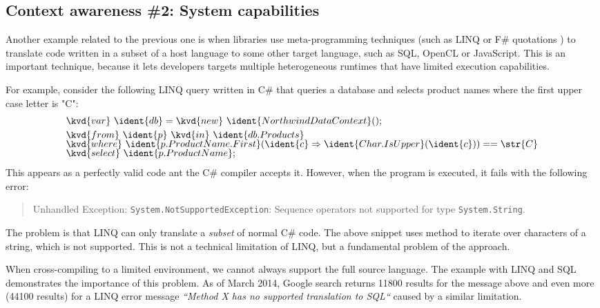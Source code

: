 
\subsection{Context awareness \#2: System capabilities}

Another example related to the previous one is when libraries use meta-programming techniques
(such as LINQ \cite{app-linq} or F\# quotations \cite{app-fsharp-metaprog}) to translate code
written in a subset of a host language to some other target language, such as SQL, OpenCL or 
JavaScript. This is an important technique, because it lets developers targets multiple 
heterogeneous runtimes that have limited execution capabilities.

For example, consider the following LINQ query written in C\# that queries a database and
selects product names where the first upper case letter is "C":
%
\begin{equation*}
\begin{array}{l}
\kvd{var}~\ident{db} = \kvd{new}~\ident{NorthwindDataContext}();\\[0.25em]
\kvd{from}~\ident{p}~\kvd{in}~\ident{db.Products}\\[-0.25em]
\kvd{where}~\ident{p.ProductName.First}(\ident{c} \Rightarrow \ident{Char.IsUpper}(\ident{c})) == \str{C}\\[-0.25em]
\kvd{select}~\ident{p.ProductName};
\end{array}
\end{equation*}
%
This appears as a perfectly valid code ant the C\# compiler accepts it. However, when the program
is executed, it fails with the following error:
%
\begin{quote}
Unhandled Exception: \texttt{System.NotSupportedException}: Sequence operators 
not supported for type \texttt{System.String}.
\end{quote}
%
The problem is that LINQ can only translate a \emph{subset} of normal C\# code. The above snippet
uses  method to iterate over characters of a string, which is not supported. This is
not a technical limitation of LINQ, but a fundamental problem of the approach. 

When cross-compiling to a limited environment, we cannot always support the full source language.
The example with LINQ and SQL demonstrates the importance of this problem. As of March 2014,
Google search returns 11800 results for the message above and even more (44100 results) for a
LINQ error message \emph{``Method X has no supported translation to SQL``} caused by a similar 
limitation. 


